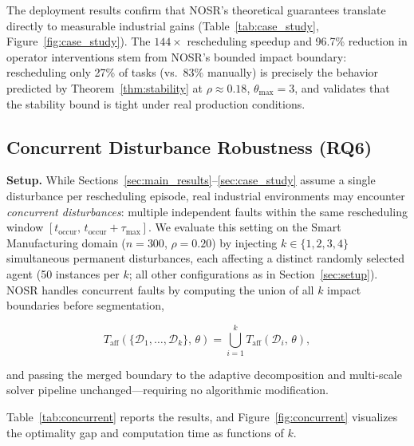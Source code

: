 \documentclass[manuscript,screen,review]{acmart}
\begin{document}
The deployment results confirm that NOSR's theoretical guarantees
translate directly to measurable industrial gains
(Table~\ref{tab:case_study}, Figure~\ref{fig:case_study}).
The $144\times$ rescheduling speedup and 96.7\% reduction in operator
interventions stem from NOSR's bounded impact boundary: rescheduling
only 27\% of tasks (vs.\ 83\% manually) is precisely the behavior
predicted by Theorem~\ref{thm:stability} at $\rho\approx 0.18$,
$\theta_{\max}=3$, and validates that the stability bound is tight
under real production conditions.

\subsection{Concurrent Disturbance Robustness (RQ6)}
\label{sec:rq6}

\noindent\textbf{Setup.}
While Sections~\ref{sec:main_results}--\ref{sec:case_study} assume a single
disturbance per rescheduling episode, real industrial environments may encounter
\emph{concurrent disturbances}: multiple independent faults within the same
rescheduling window $[t_{\mathrm{occur}},\, t_{\mathrm{occur}} + \tau_{\max}]$.
We evaluate this setting on the Smart Manufacturing domain ($n = 300$,
$\rho = 0.20$) by injecting $k \in \{1,2,3,4\}$ simultaneous permanent
disturbances, each affecting a distinct randomly selected agent
(50 instances per $k$; all other configurations as in
Section~\ref{sec:setup}).
NOSR handles concurrent faults by computing the union of all $k$ impact
boundaries before segmentation,

$$T_{\mathrm{aff}}\!\left(\{\mathcal{D}_1,\ldots,\mathcal{D}_k\},\,\theta\right)
= \bigcup_{i=1}^{k} T_{\mathrm{aff}}(\mathcal{D}_i,\,\theta),$$

and passing the merged boundary to the adaptive decomposition and multi-scale
solver pipeline unchanged---requiring no algorithmic modification.

Table~\ref{tab:concurrent} reports the results, and
Figure~\ref{fig:concurrent} visualizes the optimality gap and computation
time as functions of $k$.
\end{document}
